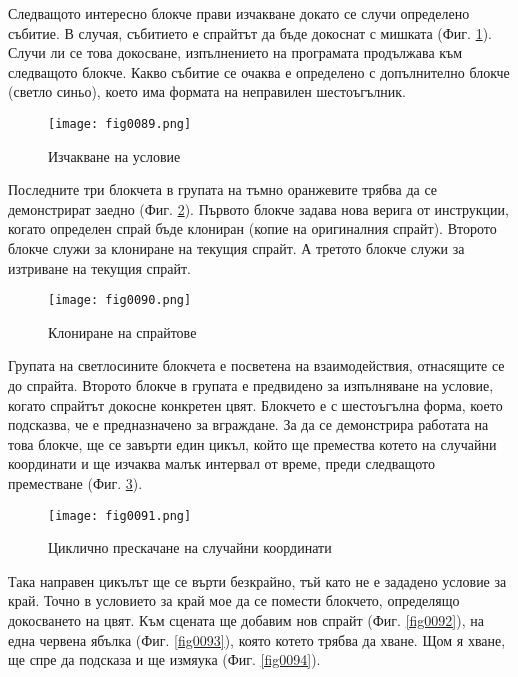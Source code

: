Следващото интересно блокче прави изчакване докато се случи определено събитие. В случая, събитието е спрайтът да бъде докоснат с мишката (Фиг. \ref{fig0089}). Случи ли се това докосване, изпълнението на програмата продължава към следващото блокче. Какво събитие се очаква е определено с допълнително блокче (светло синьо), което има формата на неправилен шестоъгълник.

\begin{figure}[H]
  \centering
  \texttt{[image: fig0089.png]}
  \caption{Изчакване на условие}
\label{fig0089}
\end{figure}

Последните три блокчета в групата на тъмно оранжевите трябва да се демонстрират заедно (Фиг. \ref{fig0090}). Първото блокче задава нова верига от инструкции, когато определен спрай бъде клониран (копие на оригиналния спрайт). Второто блокче служи за клониране на текущия спрайт. А третото блокче служи за изтриване на текущия спрайт. 

\begin{figure}[H]
  \centering
  \texttt{[image: fig0090.png]}
  \caption{Клониране на спрайтове}
\label{fig0090}
\end{figure}

Групата на светлосините блокчета е посветена на взаимодействия, отнасящите се до спрайта. Второто блокче в групата е предвидено за изпълняване на условие, когато спрайтът докосне конкретен цвят. Блокчето е с шестоъгълна форма, което подсказва, че е предназначено за вграждане. За да се демонстрира работата на това блокче, ще се завърти един цикъл, който ще премества котето на случайни координати и ще изчаква малък интервал от време, преди следващото преместване (Фиг. \ref{fig0091}). 

\begin{figure}[H]
  \centering
  \texttt{[image: fig0091.png]}
  \caption{Циклично прескачане на случайни координати}
\label{fig0091}
\end{figure}

Така направен цикълът ще се върти безкрайно, тъй като не е зададено условие за край. Точно в условието за край мое да се помести блокчето, определящо докосването на цвят. Към сцената ще добавим нов спрайт (Фиг. \ref{fig0092}), на една червена ябълка (Фиг. \ref{fig0093}), която котето трябва да хване. Щом я хване, ще спре да подсказа и ще измяука (Фиг. \ref{fig0094}). 

